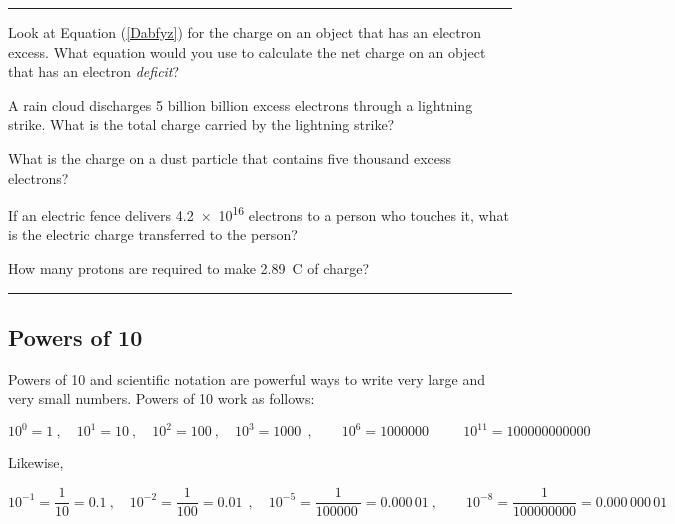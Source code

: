 \documentclass[dvipsnames]{article}
\begin{document}
\begin{multicols}{2}
\hrule

\begin{exercise} \label{9U7zJj}
    Look at Equation (\ref{Dabfyz}) for the charge on an object that has an electron excess. What equation would you use to calculate the net charge on an object that has an electron \textit{deficit}?
\end{exercise}

\begin{exercise} \label{gEsEJ7}
    A rain cloud discharges 5 billion billion excess electrons through a lightning strike. What is the total charge carried by the lightning strike?
\end{exercise}



\begin{exercise} \label{d3zygU}
    What is the charge on a dust particle that contains five thousand excess electrons?
\end{exercise}

\begin{exercise} \label{ERkfIH}
    If an electric fence delivers \SI{4.2e16}{} electrons to a person who touches it, what is the electric charge transferred to the person?
\end{exercise}

\begin{exercise} \label{9qwZGy}
    How many protons are required to make \SI{2.89}{C} of charge?
\end{exercise}

\end{multicols}

\hrule

\subsection{Powers of 10} \label{tdVujC}

Powers of 10 and scientific notation are powerful ways to write very large and very small numbers. Powers of 10 work as follows:

\begin{equation*}
    10^0 = 1\ , \quad 10^1 = 10\ , \quad 10^2 = 100\ , \quad 10^3 = \SI{1000}{}\ , \qquad 10^6 = \SI{1000000}{}\ \qquad 10^{11} = \SI{100000000000}{}
\end{equation*}

Likewise,

\begin{equation*}
    10^{-1} = \frac{1}{10} = 0.1\ , \quad
    10^{-2} = \frac{1}{100} = \SI{0.01}{}\ , \quad 
    10^{-5} = \frac{1}{\SI{100000}{}} = 0.000\,01\ ,\qquad
    10^{-8} = \frac{1}{\num{100000000}} = 0.000\,000\,01
\end{equation*}
\end{document}
